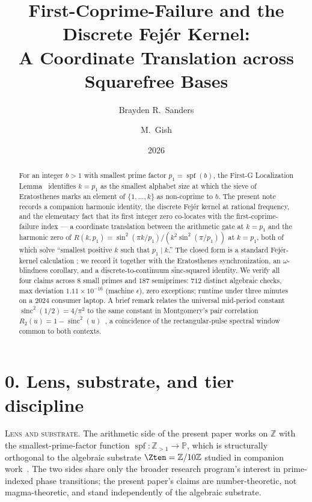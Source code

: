 \documentclass[11pt,reqno]{amsart}
\title[First-Coprime-Failure and the Discrete Fej\'er Kernel]%
{First-Coprime-Failure and the Discrete Fej\'er Kernel:\\
 A Coordinate Translation across Squarefree Bases}
\author{Brayden R.\ Sanders}
\author{M.\ Gish}
\date{2026}
\theoremstyle{plain}
\theoremstyle{definition}
\theoremstyle{remark}
\DeclareMathOperator{\spf}{spf}
\DeclareMathOperator{\sinc}{sinc}
\newcommand{\Z}{\mathbb{Z}}
\newcommand{\Prm}{\mathbb{P}}
\begin{document}
\begin{abstract}
For an integer $b > 1$ with smallest prime factor $p_1 = \spf(b)$,
the First-G Localization Lemma~\cite{J04Sanders} identifies
$k = p_1$ as the smallest alphabet size at which the sieve of
Eratosthenes marks an element of $\{1, \ldots, k\}$ as
non-coprime to $b$. The present note records a companion
harmonic identity, the discrete Fej\'er kernel at rational
frequency, and the elementary fact that its first integer zero
co-locates with the first-coprime-failure index --- a coordinate
translation between the arithmetic gate at $k = p_1$ and the
harmonic zero of $R(k, p_1) = \sin^2(\pi k / p_1) /
(k^2 \sin^2(\pi / p_1))$ at $k = p_1$, both of which solve
``smallest positive $k$ such that $p_1 \mid k$.'' The closed form
is a standard Fej\'er-kernel calculation
\cite{Fejer1900,Apostol1976,IwaniecKowalski2004}; we record it
together with the Eratosthenes synchronization, an
$\omega$-blindness corollary, and a discrete-to-continuum
sinc-squared identity. We verify all four claims across $8$
small primes and $187$ semiprimes: $712$ distinct algebraic
checks, max deviation $1.11 \times 10^{-16}$ (machine
$\epsilon$), zero exceptions; runtime under three minutes on a
2024 consumer laptop. A brief remark relates the universal
mid-period constant $\sinc^2(1/2) = 4/\pi^2$ to the same
constant in Montgomery's pair correlation
$R_2(u) = 1 - \sinc^2(u)$~\cite{Montgomery1973}, a coincidence of
the rectangular-pulse spectral window common to both contexts.
\end{abstract}

\maketitle

\section*{0. Lens, substrate, and tier discipline}

\noindent
\textsc{Lens and substrate.}
The arithmetic side of the present paper works on $\Z$ with the
smallest-prime-factor function $\spf : \Z_{> 1} \to \Prm$, which
is structurally orthogonal to the algebraic substrate
$\Zten = \Z / 10\Z$ studied in companion
work~\cite{J04Sanders,FourCore}. The two sides share only the
broader research program's interest in prime-indexed phase
transitions; the present paper's claims are number-theoretic,
not magma-theoretic, and stand independently of the algebraic
substrate.
\end{document}
